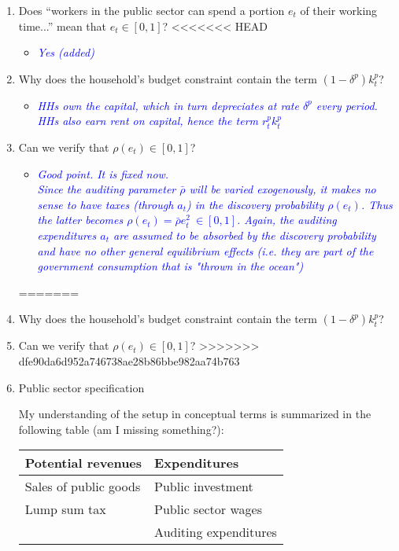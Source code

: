 \documentclass[]{scrartcl}
\begin{document}
\begin{enumerate}
\item Does ``workers in the public sector can spend a portion $ e_t $ of their working time...'' mean that $e_t \in [0,1]$?
<<<<<<< HEAD
\begin{itemize}
\item \textcolor{blue}{\textit{Yes (added)}}
\end{itemize}
\item Why does the household's budget constraint contain the term $ (1-\delta^p)k^p_t $?
\begin{itemize}
\item \textcolor{blue}{\textit{HHs own the capital, which in turn depreciates at rate $ \delta^p $ every period. HHs also earn rent on capital, hence the term $ r^p_t k_t^p $}}
\end{itemize}
\item Can we verify that $ \rho(e_t) \in [0,1] $?
\begin{itemize}
\item \textcolor{blue}{\textit{Good point. It is fixed now.\\ Since the auditing parameter $ \bar{\rho} $ will be varied exogenously, it makes no sense to have taxes (through $ a_t $) in the discovery probability $ \rho(e_t) $. Thus the latter becomes $ \rho(e_t)=\bar{\rho}e_t^2~\in[0,1] $. Again, the auditing expenditures $ a_t $ are assumed to be absorbed by the discovery probability and have no other general equilibrium effects (i.e. they are part of the government consumption that is "thrown in the ocean")}}
\end{itemize}
=======
\item Why does the household's budget constraint contain the term $ (1-\delta^p)k^p_t $?
\item Can we verify that $ \rho(e_t) \in [0,1] $?
>>>>>>> dfe90da6d952a746738ae28b86bbe982aa74b763
\item Public sector specification

My understanding of the setup in conceptual terms is summarized in the following table (am I missing something?):

\begin{tabular}{l|l}
\hline
Potential revenues & Expenditures \\ \hline
Sales of public goods & Public investment \\
Lump sum tax & Public sector wages \\
{} & Auditing expenditures
\end{tabular}


\end{enumerate}
\end{document}
